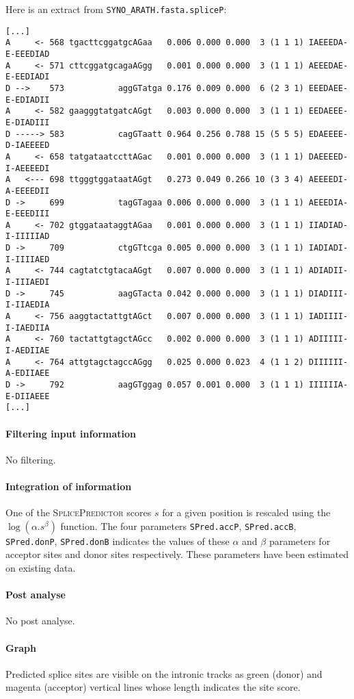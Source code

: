 Here is an extract from \texttt{SYNO\_ARATH.fasta.spliceP}:
\begin{Verbatim}[fontsize=\small]
[...]
A     <- 568 tgacttcggatgcAGaa   0.006 0.000 0.000  3 (1 1 1) IAEEEDA-E-EEEDIAD
A     <- 571 cttcggatgcagaAGgg   0.001 0.000 0.000  3 (1 1 1) AEEEDAE-E-EEDIADI
D -->    573           aggGTatga 0.176 0.009 0.000  6 (2 3 1) EEEDAEE-E-EDIADII
A     <- 582 gaagggtatgatcAGgt   0.003 0.000 0.000  3 (1 1 1) EEDAEEE-E-DIADIII
D -----> 583           cagGTaatt 0.964 0.256 0.788 15 (5 5 5) EDAEEEE-D-IAEEEED
A     <- 658 tatgataatccttAGac   0.001 0.000 0.000  3 (1 1 1) DAEEEED-I-AEEEEDI
A   <--- 698 ttgggtggataatAGgt   0.273 0.049 0.266 10 (3 3 4) AEEEEDI-A-EEEEDII
D ->     699           tagGTagaa 0.006 0.000 0.000  3 (1 1 1) AEEEDIA-E-EEEDIII
A     <- 702 gtggataataggtAGaa   0.001 0.000 0.000  3 (1 1 1) IIADIAD-I-IIIIIAD
D ->     709           ctgGTtcga 0.005 0.000 0.000  3 (1 1 1) IADIADI-I-IIIIAED
A     <- 744 cagtatctgtacaAGgt   0.007 0.000 0.000  3 (1 1 1) ADIADII-I-IIIAEDI
D ->     745           aagGTacta 0.042 0.000 0.000  3 (1 1 1) DIADIII-I-IIAEDIA
A     <- 756 aaggtactattgtAGct   0.007 0.000 0.000  3 (1 1 1) IADIIII-I-IAEDIIA
A     <- 760 tactattgtagctAGcc   0.002 0.000 0.000  3 (1 1 1) ADIIIII-I-AEDIIAE
A     <- 764 attgtagctagccAGgg   0.025 0.000 0.023  4 (1 1 2) DIIIIII-A-EDIIAEE
D ->     792           aagGTggag 0.057 0.001 0.000  3 (1 1 1) IIIIIIA-E-DIIAEEE
[...]
\end{Verbatim}

\paragraph{Filtering input information}

No filtering.

\paragraph{Integration of information}

One of the \textsc{SplicePredictor} scores $s$ for a given position is
rescaled using the $\log(\alpha.s^\beta)$ function. The four parameters
\texttt{SPred.accP}, \texttt{SPred.accB}, \texttt{SPred.donP},
\texttt{SPred.donB} indicates the values of these $\alpha$ and $\beta$
parameters for acceptor sites and donor sites respectively.  These
parameters have been estimated on existing data.

\paragraph{Post analyse}

No post analyse.

\paragraph{Graph}

Predicted splice sites are visible on the intronic tracks as green
(donor) and magenta (acceptor) vertical lines whose length indicates
the site score.
